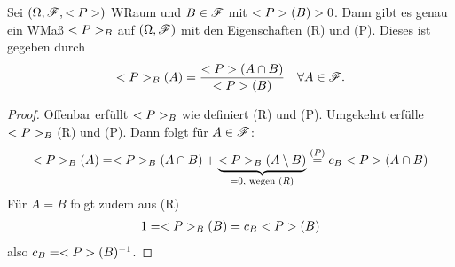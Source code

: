 \begin{lemma}
	Sei $(\Omega, \mathscr{F}, <P>)$ WRaum und $B \in \mathscr{F}$ mit $<P>(B) > 0$. Dann gibt es genau ein WMaß $<P>_B$ auf $(\Omega, \mathscr{F})$ mit den Eigenschaften (R) und (P). Dieses ist gegeben durch
	\begin{align}
		<P>_{B}(A) = \frac{<P>(A\cap B)}{<P>(B)} \quad \forall A \in \mathscr{F}.\notag
	\end{align}
\end{lemma}

\begin{proof}
	Offenbar erfüllt $<P>_{B}$ wie definiert (R) und (P). Umgekehrt erfülle $<P>_{B}$ (R) und (P). Dann folgt für $A \in \mathscr{F}$:
	\begin{align}
		<P>_{B}(A) = <P>_{B}(A\cap B) + \underbrace{<P>_{B}(A\setminus B)}_{= 0, \text{ wegen } (R)} \overset{(P)}{=} c_B <P>(A \cap B) \notag
	\end{align}
    Für $A=B$ folgt zudem aus (R)
    \begin{align}
        1 = <P>_{B}(B) = c_B <P>(B) \notag
    \end{align}
    also $c_B = <P>(B)^{-1}$.
\end{proof}